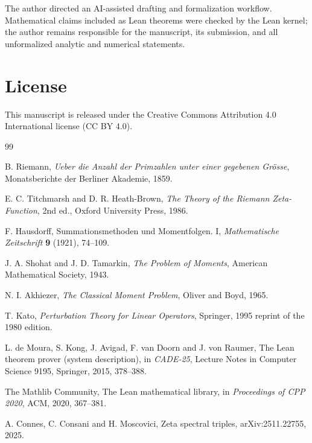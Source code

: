 \documentclass[11pt]{article}
\theoremstyle{definition}
\begin{document}
The author directed an AI-assisted drafting and formalization workflow.
Mathematical claims included as Lean theorems were checked by the Lean kernel;
the author remains responsible for the manuscript, its submission, and all
unformalized analytic and numerical statements.

\section*{License}

This manuscript is released under the Creative Commons Attribution 4.0
International license (CC BY 4.0).

\clearpage
\begin{thebibliography}{99}

B. Riemann,
\emph{Ueber die Anzahl der Primzahlen unter einer gegebenen Gr\"osse},
Monatsberichte der Berliner Akademie, 1859.

E. C. Titchmarsh and D. R. Heath-Brown,
\emph{The Theory of the Riemann Zeta-Function}, 2nd ed.,
Oxford University Press, 1986.

F. Hausdorff,
Summationsmethoden und Momentfolgen. I,
\emph{Mathematische Zeitschrift} \textbf{9} (1921), 74--109.

J. A. Shohat and J. D. Tamarkin,
\emph{The Problem of Moments},
American Mathematical Society, 1943.

N. I. Akhiezer,
\emph{The Classical Moment Problem},
Oliver and Boyd, 1965.

T. Kato,
\emph{Perturbation Theory for Linear Operators},
Springer, 1995 reprint of the 1980 edition.

L. de Moura, S. Kong, J. Avigad, F. van Doorn and J. von Raumer,
The Lean theorem prover (system description),
in \emph{CADE-25}, Lecture Notes in Computer Science 9195,
Springer, 2015, 378--388.

The Mathlib Community,
The Lean mathematical library,
in \emph{Proceedings of CPP 2020}, ACM, 2020, 367--381.

A. Connes, C. Consani and H. Moscovici,
Zeta spectral triples,
arXiv:2511.22755, 2025.

\end{thebibliography}
\end{document}
